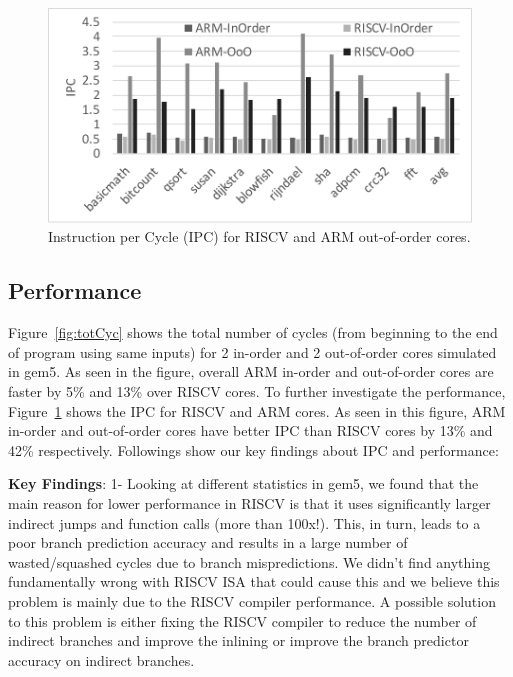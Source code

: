 \begin{figure}[]
	\centering
	\includegraphics[width=1\columnwidth]{figures/ipc.pdf}
	\caption{Instruction per Cycle (IPC) for RISCV and ARM out-of-order cores.}
	\label{fig:ipc}
	\vspace{-1em}
\end{figure} 


\subsection{Performance}
Figure~\ref{fig:totCyc} shows the total number of cycles (from beginning to the end of program using same inputs) for 2 in-order and 2 out-of-order cores simulated in gem5. As seen in the figure, overall ARM in-order and out-of-order cores are faster by 5\% and 13\% over RISCV cores. To further investigate the performance, Figure~\ref{fig:ipc} shows the IPC for RISCV and ARM cores. As seen in this figure, ARM in-order and out-of-order cores have better IPC than RISCV cores by 13\% and 42\% respectively. Followings show our key findings about IPC and performance:

\noindent \textbf{Key Findings}: 1- Looking at different statistics in gem5, we found that the main reason for lower performance in RISCV is that it uses significantly larger indirect jumps and function calls (more than 100x!). This, in turn, leads to a poor branch prediction accuracy and results in a large number of wasted/squashed cycles due to branch mispredictions. We didn't find anything fundamentally wrong with RISCV ISA that could cause this and we believe this problem is mainly due to the RISCV compiler performance. A possible solution to this problem is either fixing the RISCV compiler to reduce the number of indirect branches and improve the inlining or improve the branch predictor accuracy on indirect branches. 


